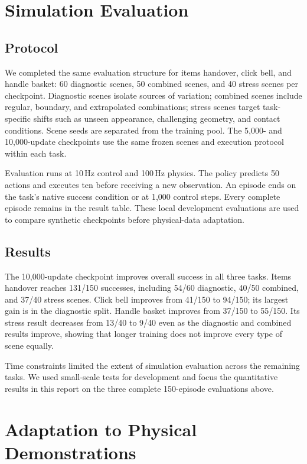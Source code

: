 \documentclass{article}
\begin{document}
\section{Simulation Evaluation}
\subsection{Protocol}
We completed the same evaluation structure for items handover, click bell,
and handle basket: 60 diagnostic scenes, 50 combined scenes, and 40 stress
scenes per checkpoint. Diagnostic scenes isolate sources of variation;
combined scenes include regular, boundary, and extrapolated combinations;
stress scenes target task-specific shifts such as unseen appearance,
challenging geometry, and contact conditions. Scene seeds are separated
from the training pool. The 5,000- and 10,000-update checkpoints use the
same frozen scenes and execution protocol within each task.

Evaluation runs at 10\,Hz control and 100\,Hz physics. The policy predicts
50 actions and executes ten before receiving a new observation. An
episode ends on the task's native success condition or at 1,000 control
steps. Every complete episode remains in the result table. These local
development evaluations are used to compare synthetic checkpoints before
physical-data adaptation.



\subsection{Results}
The 10,000-update checkpoint improves overall success in all three tasks.
Items handover reaches 131/150 successes, including 54/60 diagnostic,
40/50 combined, and 37/40 stress scenes. Click bell improves from 41/150
to 94/150; its largest gain is in the diagnostic split. Handle basket
improves from 37/150 to 55/150. Its stress result decreases from 13/40
to 9/40 even as the diagnostic and combined results improve, showing that
longer training does not improve every type of scene equally.

Time constraints limited the extent of simulation evaluation across the
remaining tasks. We used small-scale tests for development and focus the
quantitative results in this report on the three complete 150-episode
evaluations above.

\section{Adaptation to Physical Demonstrations}
\end{document}
